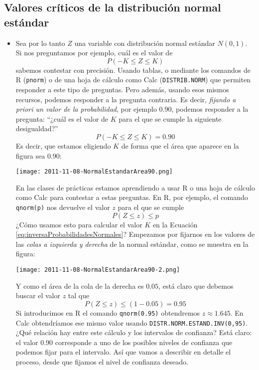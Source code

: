        \subsection*{Valores críticos de la distribución normal estándar}

       \begin{itemize}


       \item Sea por lo tanto $Z$ una variable con distribución normal estándar $N(0,1)$. Si nos preguntamos por ejemplo, cuál es el valor de
       \[P(-K\leq Z\leq K)\]
       sabemos contestar con precisión. Usando tablas, o mediante los comandos de R ({\tt pnorm}) o de una hoja de cálculo como Calc ({\tt DISTRIB.NORM}) que permiten responder a este tipo de preguntas.  Pero además, usando esos mismos recursos, podemos responder a la pregunta contraria. Es decir, {\em fijando a priori un valor de la probabilidad}, por ejemplo $0.90$, podemos responder a la pregunta: ``¿cuál es el valor de $K$ para el que se cumple la siguiente desigualdad?''
       \begin{equation}\label{eq:inversaProbabilidadesNormales}
       P(-K\leq Z\leq K)=0.90
       \end{equation}
       Es decir, que estamos eligiendo $K$ de forma que el área que aparece en la figura sea $0.90$:
       \begin{center}
       \texttt{[image: 2011-11-08-NormalEstandarArea90.png]}
       \end{center}
        En las clases de prácticas estamos aprendiendo a usar R o una hoja de cálculo como Calc para contestar a estas preguntas. En R, por ejemplo, el comando {\tt qnorm(p)} nos devuelve el valor $z$ para el que se cumple
        \[P(Z\leq z)\leq p\]
        ¿Cómo usamos esto para calcular el valor $K$ en la Ecuación \ref{eq:inversaProbabilidadesNormales}? Empezamos por fijarnos en los valores de las {\em colas a izquierda y derecha} de la normal estándar, como se muestra en la figura:
       \begin{center}
       \texttt{[image: 2011-11-08-NormalEstandarArea90-2.png]}
       \end{center}
       Y como el área de la cola de la derecha es $0.05$, está claro que debemos buscar el valor $z$ tal que
        \[P(Z\leq z)\leq (1-0.05)=0.95\]
        Si introducimos en R el comando {\tt qnorm(0.95)} obtendremos $z\approx 1.645$. En Calc obtendríamos ese mismo valor usando {\tt DISTR.NORM.ESTAND.INV(0,95)}.  ¿Qué relación hay entre este cálculo y los intervalos de confianza? Está claro: el valor $0.90$ corresponde a uno de los posibles niveles de confianza que podemos fijar para el intervalo. Así que vamos a describir en detalle el proceso, desde que fijamos el nivel de confianza deseado.


\end{itemize}
